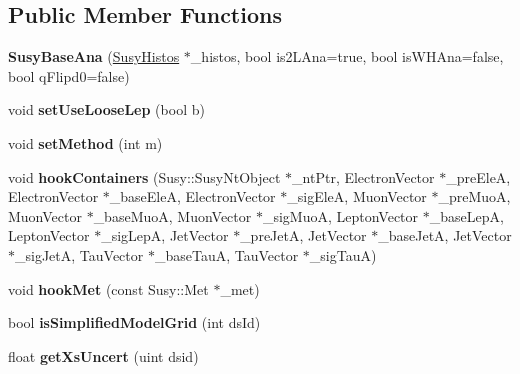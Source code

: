 \subsection*{Public Member Functions}
\begin{DoxyCompactItemize}
\item 
\hypertarget{classSusyBaseAna_accf5ab460f9a98ff5caaea35218513ee}{
{\bfseries SusyBaseAna} (\hyperlink{classSusyHistos}{SusyHistos} $\ast$\_\-histos, bool is2LAna=true, bool isWHAna=false, bool qFlipd0=false)}
\label{classSusyBaseAna_accf5ab460f9a98ff5caaea35218513ee}

\item 
\hypertarget{classSusyBaseAna_a78e6d0b763df2f96ef0de1c2220e6a6a}{
void {\bfseries setUseLooseLep} (bool b)}
\label{classSusyBaseAna_a78e6d0b763df2f96ef0de1c2220e6a6a}

\item 
\hypertarget{classSusyBaseAna_a293ed2785910de12869f8b791d03788b}{
void {\bfseries setMethod} (int m)}
\label{classSusyBaseAna_a293ed2785910de12869f8b791d03788b}

\item 
\hypertarget{classSusyBaseAna_a9051f708fa685d0aac5edc6375d95344}{
void {\bfseries hookContainers} (Susy::SusyNtObject $\ast$\_\-ntPtr, ElectronVector $\ast$\_\-preEleA, ElectronVector $\ast$\_\-baseEleA, ElectronVector $\ast$\_\-sigEleA, MuonVector $\ast$\_\-preMuoA, MuonVector $\ast$\_\-baseMuoA, MuonVector $\ast$\_\-sigMuoA, LeptonVector $\ast$\_\-baseLepA, LeptonVector $\ast$\_\-sigLepA, JetVector $\ast$\_\-preJetA, JetVector $\ast$\_\-baseJetA, JetVector $\ast$\_\-sigJetA, TauVector $\ast$\_\-baseTauA, TauVector $\ast$\_\-sigTauA)}
\label{classSusyBaseAna_a9051f708fa685d0aac5edc6375d95344}

\item 
\hypertarget{classSusyBaseAna_ad8ec8c7886d0d265963f6744da7a6522}{
void {\bfseries hookMet} (const Susy::Met $\ast$\_\-met)}
\label{classSusyBaseAna_ad8ec8c7886d0d265963f6744da7a6522}

\item 
\hypertarget{classSusyBaseAna_a69619f7eeac5b97852bdb8e77b45a13a}{
bool {\bfseries isSimplifiedModelGrid} (int dsId)}
\label{classSusyBaseAna_a69619f7eeac5b97852bdb8e77b45a13a}

\item 
\hypertarget{classSusyBaseAna_ad7e0a457c025155b13d14f53cf57b777}{
float {\bfseries getXsUncert} (uint dsid)}
\label{classSusyBaseAna_ad7e0a457c025155b13d14f53cf57b777}


\end{DoxyCompactItemize}
